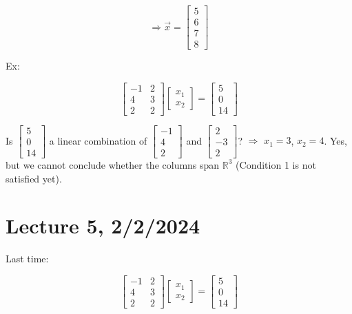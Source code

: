 \documentclass{article}
\begin{document}
\[\Rightarrow \vec{x} = \begin{bmatrix} 5 \\ 6 \\ 7 \\ 8 \end{bmatrix} \]

Ex:

\[
\begin{bmatrix}
    -1 & 2 \\
    4 & 3 \\
    2 & 2 
\end{bmatrix}
\begin{bmatrix}
    x_1 \\
    x_2
\end{bmatrix}
=
\begin{bmatrix}
    5 \\
    0 \\
    14
\end{bmatrix}
\]

Is \(\begin{bmatrix} 5 \\ 0 \\ 14 \end{bmatrix}\) a linear combination of \(\begin{bmatrix} -1 \\ 4 \\ 2 \end{bmatrix}\) and \(\begin{bmatrix} 2 \\ -3 \\ 2 \end{bmatrix}\)? 
\(\Rightarrow\) \(x_1 = 3\), \(x_2 = 4\). Yes, but we cannot conclude whether the columns span \(\mathbb{R}^3\) (Condition 1 is not satisfied yet).


\section{Lecture 5, 2/2/2024}

Last time: 

\[
\begin{bmatrix}
    -1 & 2 \\
    4 & 3 \\
    2 & 2 
\end{bmatrix}
\begin{bmatrix}
    x_1 \\
    x_2
\end{bmatrix}
=
\begin{bmatrix}
    5 \\
    0 \\
    14
\end{bmatrix}
\]
\end{document}
